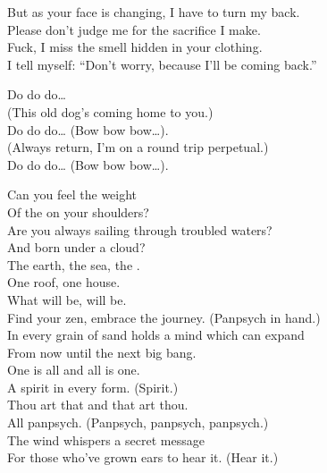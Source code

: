 
But as your face is changing, I have to turn my back. \\
Please don't judge me for the sacrifice I make. \\
Fuck, I miss the smell hidden in your clothing. \\
I tell myself: ``Don't worry, because I'll be coming back.'' \\


Do do do… \\
(This old dog's coming home to you.) \\
Do do do… (Bow bow bow…). \\
(Always return, I'm on a round trip perpetual.) \\
Do do do… (Bow bow bow…). \\





Can you feel the weight \\
Of the  on your shoulders? \\
Are you always sailing through troubled waters? \\
And born under a cloud? \\
The earth, the sea, the . \\
One roof, one house. \\

What will be, will be. \\
Find your zen, embrace the journey. (Panpsych in hand.) \\
In every grain of sand holds a mind which can expand \\
From now until the next big bang. \\

One is all and all is one. \\
A spirit in every form. (Spirit.) \\
Thou art that and that art thou. \\
All panpsych. (Panpsych, panpsych, panpsych.) \\
The wind whispers a secret message \\
For those who've grown ears to hear it. (Hear it.) \\


